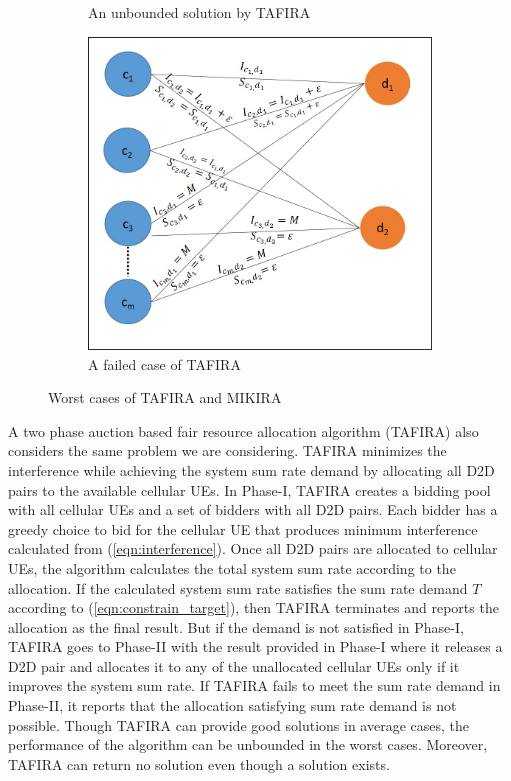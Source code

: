 \documentclass{ieeeaccess}
\begin{document}
\begin{figure}[t]
{{\begin{subfigure}{0.32\linewidth}
\caption{An unbounded solution by TAFIRA}
\label{fig:bad2}
\end{subfigure}
\begin{subfigure}{0.32\linewidth}
\centering
\includegraphics[width=\linewidth]{Graph/badExample3.jpg}
\caption{A failed case of TAFIRA}
\label{fig:bad3}
\end{subfigure}
}
}%
\caption{Worst cases of TAFIRA and MIKIRA}
\end{figure}


\smallskip
 
A two phase auction based fair resource allocation algorithm (TAFIRA) \cite{islam2016radio} also considers the same problem we are considering. TAFIRA minimizes the interference while achieving the system sum rate demand by allocating all D2D pairs to the available cellular UEs. In Phase-I, TAFIRA creates a bidding pool with all cellular UEs and a set of bidders with all D2D pairs. Each bidder has a greedy choice to bid for the cellular UE that produces minimum interference calculated from (\ref{eqn:interference}). Once all D2D pairs are allocated to cellular UEs, the algorithm calculates the total system sum rate according to the allocation. If the calculated system sum rate satisfies the sum rate demand $T$ according to (\ref{eqn:constrain_target}), then TAFIRA terminates and reports the allocation as the final result. But if the demand is not satisfied in Phase-I, TAFIRA goes to Phase-II with the result provided in Phase-I where it releases a D2D pair and allocates it to any of the unallocated cellular UEs only if it improves the system sum rate. If TAFIRA fails to meet the sum rate demand in Phase-II, it reports that the allocation satisfying sum rate demand is not possible. Though TAFIRA can provide good solutions in average cases, the performance of the algorithm can be unbounded in the worst cases. Moreover, TAFIRA can return no solution even though a solution exists.
\end{document}

